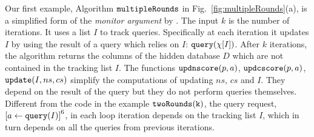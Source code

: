 %
Our first example, Algorithm $\mathtt{multipleRounds}$ in Fig.~\ref{fig:multipleRounds}(a), is a simplified form of the \emph{monitor argument} by \citet{RogersRSSTW20}.
The input $k$ is the number of iterations.
It uses a list $I$ to track queries. Specifically at each iteration it updates $I$ by using the result of a query which relies on $I$:  ${\tt query}(\chi[I])$.
After $k$ iterations, the algorithm returns the columns of the hidden database $D$ which are not contained in the  tracking list $I$.
The functions $\mathtt{updnscore}(p,a)$,
$\mathtt{updcscore}(p,a)$, $\mathtt{update}(I,ns,cs)$ simplify the computations of updating $ns$, $cs$ and $I$. They depend on the result of the query but they do not perform queries themselves. %
%
%
Different from the code in the example $\mathtt{twoRounds(k)}$,
the query request, $\clabel{\assign{a}{\query(I)}}^6$, in each loop iteration
depends on the tracking list $I$, which in turn depends on  all the queries from previous iterations. 
